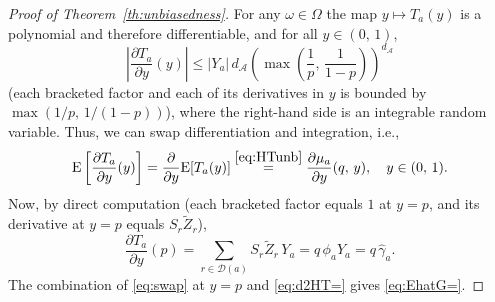\documentclass[sigconf,nonacm]{acmart}
\newcommand{\E}{\mathrm E}
\begin{document}
\begin{proof}[Proof of Theorem~\ref{th:unbiasedness}]
For any $\omega\in\Omega$ the map $y\mapsto T_a(y)$ is a polynomial and therefore differentiable, and for all $y\in(0,\,1)$,
\begin{equation*}
    \left|\frac{\partial T_a}{\partial y}(y)\right|
    \le |Y_a|\, d_{\mathcal A}\left(\max\left(\frac 1p,\,\frac 1{1-p}\right)\right)^{d_{\mathcal A}}
\end{equation*}
(each bracketed factor and each of its derivatives in $y$ is bounded by $\max(1/p,\,1/(1-p))$), where the right-hand side is an integrable random variable. Thus, we can swap differentiation and integration, i.e.,
\begin{equation}\label{eq:swap}
    \E\left[\frac{\partial T_a}{\partial y}(y)\right] = \frac{\partial}{\partial y}\E[T_a(y)] \stackrel{\eqref{eq:HTunb}}{=} \frac{\partial \mu_a}{\partial y}(q,\,y),\quad y\in(0,\,1).
\end{equation}
Now, by direct computation (each bracketed factor equals $1$ at $y=p$, and its derivative at $y=p$ equals $S_r\tilde Z_r$),
\begin{equation}\label{eq:d2HT=}
    \frac{\partial T_a}{\partial y}(p) =
    \sum_{r\in\mathcal{D}(a)} S_r\tilde Z_r\, Y_a = q\,\phi_a Y_a = q\,\hat\gamma_a.
\end{equation}
The combination of \eqref{eq:swap} at $y=p$ and \eqref{eq:d2HT=} gives \eqref{eq:EhatG=}.


\end{proof}
\end{document}
